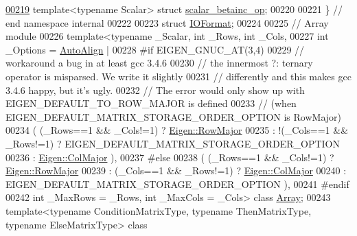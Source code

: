 \begin{DoxyCode}
\hyperlink{struct_eigen_1_1internal_1_1scalar__betainc__op}{00219} \textcolor{keyword}{template}<\textcolor{keyword}{typename} Scalar> \textcolor{keyword}{struct }\hyperlink{struct_eigen_1_1internal_1_1scalar__betainc__op}{scalar\_betainc\_op};
00220 
00221 \} \textcolor{comment}{// end namespace internal}
00222 
00223 \textcolor{keyword}{struct }\hyperlink{group___core___module_struct_eigen_1_1_i_o_format}{IOFormat};
00224 
00225 \textcolor{comment}{// Array module}
00226 \textcolor{keyword}{template}<\textcolor{keyword}{typename} \_Scalar, \textcolor{keywordtype}{int} \_Rows, \textcolor{keywordtype}{int} \_Cols,
00227          \textcolor{keywordtype}{int} \_Options = \hyperlink{group__enums_ggaacded1a18ae58b0f554751f6cdf9eb13a28d63c0dd8560827162decfd898804f4}{AutoAlign} |
00228 \textcolor{preprocessor}{#if EIGEN\_GNUC\_AT(3,4)}
00229     \textcolor{comment}{// workaround a bug in at least gcc 3.4.6}
00230     \textcolor{comment}{// the innermost ?: ternary operator is misparsed. We write it slightly}
00231     \textcolor{comment}{// differently and this makes gcc 3.4.6 happy, but it's ugly.}
00232     \textcolor{comment}{// The error would only show up with EIGEN\_DEFAULT\_TO\_ROW\_MAJOR is defined}
00233     \textcolor{comment}{// (when EIGEN\_DEFAULT\_MATRIX\_STORAGE\_ORDER\_OPTION is RowMajor)}
00234                           ( (\_Rows==1 && \_Cols!=1) ? \hyperlink{group__enums_ggaacded1a18ae58b0f554751f6cdf9eb13acfcde9cd8677c5f7caf6bd603666aae3}{Eigen::RowMajor}
00235                           : !(\_Cols==1 && \_Rows!=1) ?  EIGEN\_DEFAULT\_MATRIX\_STORAGE\_ORDER\_OPTION
00236                           : \hyperlink{group__enums_ggaacded1a18ae58b0f554751f6cdf9eb13a0cbd4bdd0abcfc0224c5fcb5e4f6669a}{Eigen::ColMajor} ),
00237 #\textcolor{keywordflow}{else}
00238                           ( (\_Rows==1 && \_Cols!=1) ? \hyperlink{group__enums_ggaacded1a18ae58b0f554751f6cdf9eb13acfcde9cd8677c5f7caf6bd603666aae3}{Eigen::RowMajor}
00239                           : (\_Cols==1 && \_Rows!=1) ? \hyperlink{group__enums_ggaacded1a18ae58b0f554751f6cdf9eb13a0cbd4bdd0abcfc0224c5fcb5e4f6669a}{Eigen::ColMajor}
00240                           : EIGEN\_DEFAULT\_MATRIX\_STORAGE\_ORDER\_OPTION ),
00241 \textcolor{preprocessor}{#endif}
00242          \textcolor{keywordtype}{int} \_MaxRows = \_Rows, \textcolor{keywordtype}{int} \_MaxCols = \_Cols> \textcolor{keyword}{class }\hyperlink{group___core___module_class_eigen_1_1_array}{Array};
00243 \textcolor{keyword}{template}<\textcolor{keyword}{typename} ConditionMatrixType, \textcolor{keyword}{typename} ThenMatrixType, \textcolor{keyword}{typename} ElseMatrixType> \textcolor{keyword}{class }

\end{DoxyCode}
